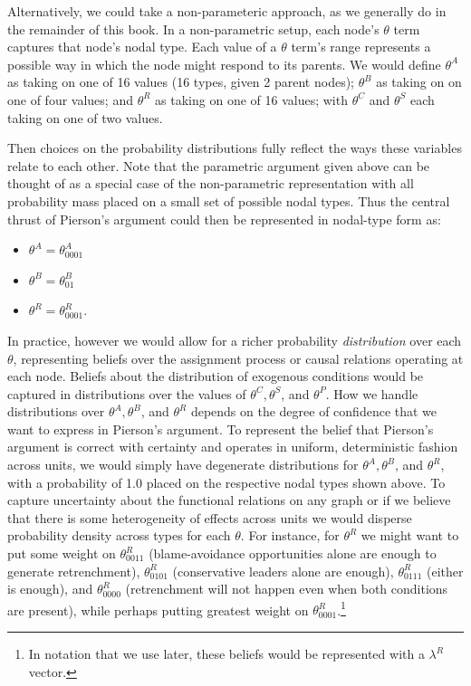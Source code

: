 \documentclass[
  12pt,
]{book}
\providecommand{\tightlist}{%
  \setlength{\itemsep}{0pt}\setlength{\parskip}{0pt}}
\begin{document}
Alternatively, we could take a non-parameteric approach, as we generally do in the remainder of this book. In a non-parametric setup, each node's \(\theta\) term captures that node's nodal type. Each value of a \(\theta\) term's range represents a possible way in which the node might respond to its parents. We would define \(\theta^A\) as taking on one of 16 values (16 types, given 2 parent nodes); \(\theta^B\) as taking on on one of four values; and \(\theta^R\) as taking on one of 16 values; with \(\theta^C\) and \(\theta^S\) each taking on one of two values.

Then choices on the probability distributions fully reflect the ways these variables relate to each other. Note that the parametric argument given above can be thought of as a special case of the non-parametric representation with all probability mass placed on a small set of possible nodal types. Thus the central thrust of Pierson's argument could then be represented in nodal-type form as:

\begin{itemize}
\tightlist
\item
  \(\theta^A=\theta^A_{0001}\)
\item
  \(\theta^B=\theta^B_{01}\)
\item
  \(\theta^R=\theta^R_{0001}\).
\end{itemize}

In practice, however we would allow for a richer probability \emph{distribution} over each \(\theta\), representing beliefs over the assignment process or causal relations operating at each node. Beliefs about the distribution of exogenous conditions would be captured in distributions over the values of \(\theta^C, \theta^S\), and \(\theta^P\). How we handle distributions over \(\theta^A, \theta^B\), and \(\theta^R\) depends on the degree of confidence that we want to express in Pierson's argument. To represent the belief that Pierson's argument is correct with certainty and operates in uniform, deterministic fashion across units, we would simply have degenerate distributions for \(\theta^A, \theta^B\), and \(\theta^R\), with a probability of 1.0 placed on the respective nodal types shown above. To capture uncertainty about the functional relations on any graph or if we believe that there is some heterogeneity of effects across units we would disperse probability density across types for each \(\theta\). For instance, for \(\theta^R\) we might want to put some weight on \(\theta^R_{0011}\) (blame-avoidance opportunities alone are enough to generate retrenchment), \(\theta^R_{0101}\) (conservative leaders alone are enough), \(\theta^R_{0111}\) (either is enough), and \(\theta^R_{0000}\) (retrenchment will not happen even when both conditions are present), while perhaps putting greatest weight on \(\theta^R_{0001}\).\footnote{In notation that we use later, these beliefs would be represented with a \(\lambda^R\) vector.}
\end{document}
